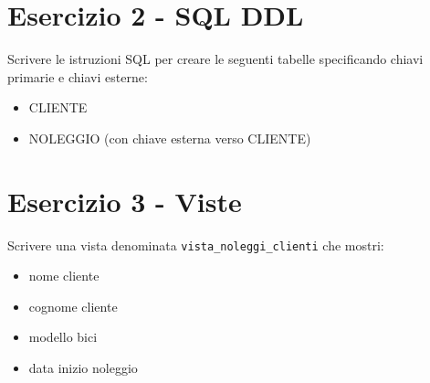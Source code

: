 \documentclass[a4paper,12pt]{article}
\begin{document}
\section*{Esercizio 2 - SQL DDL}

Scrivere le istruzioni SQL per creare le seguenti tabelle specificando chiavi primarie e chiavi esterne:

\begin{itemize}
\item CLIENTE
\item NOLEGGIO (con chiave esterna verso CLIENTE)
\end{itemize}

\section*{Esercizio 3 - Viste}

Scrivere una vista denominata \texttt{vista\_noleggi\_clienti} che mostri:

\begin{itemize}
\item nome cliente
\item cognome cliente
\item modello bici
\item data inizio noleggio
\end{itemize}
\end{document}

